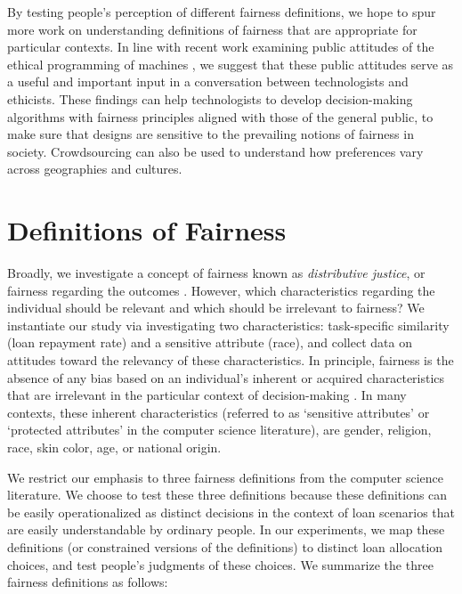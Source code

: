 \documentclass[letterpaper]{article} %
\begin{document}
By testing people's perception of different fairness definitions, we hope to spur more work on understanding definitions of fairness that are appropriate for particular contexts. In line with recent work examining public attitudes of the ethical programming of machines  \cite{bonnefon2016social,awad2018moral}, we suggest that these public attitudes serve as a useful and important input in a conversation between technologists and ethicists. These findings can help technologists to develop decision-making algorithms with fairness principles aligned with those of the general public, to make sure that designs are sensitive to the prevailing notions of fairness in society. Crowdsourcing can also be used to understand how preferences vary across geographies and cultures. 






\section{Definitions of Fairness}

Broadly, we investigate a concept of fairness known as \textit{distributive justice}, or fairness regarding the outcomes \cite{adams1963towards,adams1965inequity}. However, which characteristics regarding the individual should be relevant and which should be irrelevant to fairness? We instantiate our study via investigating two characteristics: task-specific similarity (loan repayment rate) and a sensitive attribute (race), and collect data on attitudes toward the relevancy of these characteristics. In principle, fairness is the absence of any bias based on an individual's inherent or acquired characteristics that are irrelevant in the particular context of decision-making \cite{chouldechova2017fair}. In many contexts, these inherent characteristics (referred to as `sensitive attributes' or `protected attributes' in the computer science literature), are gender, religion, race, skin color, age, or national origin.

We restrict our emphasis to three fairness definitions from the computer science literature. We choose to test these three definitions because these definitions can be easily operationalized as distinct decisions in the context of loan scenarios that are easily understandable by ordinary people. In our experiments, we map these definitions (or constrained versions of the definitions) to distinct loan allocation choices, and test people's judgments of these choices. We summarize the three fairness definitions as follows:
\end{document}
